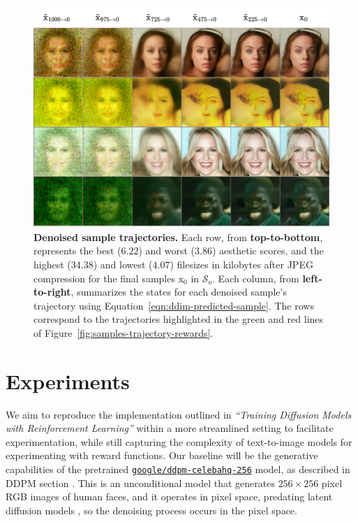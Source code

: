 \begin{figure}[ht]
  \centering
  \includegraphics[scale=0.85]{img/results/denoised-samples-trajectories.png}
  \vspace{-5pt}  %
    \captionsetup{width=\textwidth} %
    \caption{\textbf{Denoised sample trajectories.} Each row, from \textbf{top-to-bottom}, represents the best ($6.22$)
  and worst ($3.86$) aesthetic scores, and the highest ($34.38$) and lowest 
  ($4.07$) filesizes in kilobytes after JPEG compression for the final samples
  $\mathrm{x}_{0}$ in $\mathcal{S}_{o}$. Each column, from \textbf{left-to-right}, summarizes the states for each denoised sample's trajectory using Equation~\ref{eqn:ddim-predicted-sample}. The rows correspond to the trajectories highlighted in the green and red lines of Figure~\ref{fig:samples-trajectory-rewards}.}
   \label{fig:sample-trajectories}
\end{figure}


\section{Experiments}

We aim to reproduce the implementation outlined in \textit{``Training Diffusion Models with Reinforcement Learning''} \cite{black2023training} within a more streamlined setting to facilitate experimentation, while still capturing the complexity of text-to-image models for experimenting with reward functions.
Our baseline will be the generative capabilities of the pretrained \href{https://huggingface.co/google/ddpm-celebahq-256}{\texttt{\texttt{google/ddpm-celebahq-256}}} model, as described in DDPM section \cite{ho2020denoising}. This is an unconditional model that generates $256\times256$ pixel RGB images of human faces, and it operates in pixel space, predating latent diffusion models \cite{rombach2022highresolution}, so the denoising process occurs in the pixel space. \\


